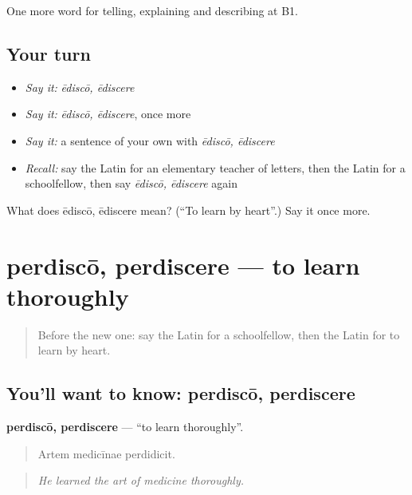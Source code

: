 \begin{grammarlens}[title={What you've built}]
One more word for telling, explaining and describing at B1.
\end{grammarlens}

\subsection*{Your turn}
\begin{itemize}
\raggedright
  \item \emph{Say it:} \emph{ēdiscō, ēdiscere}
  \item \emph{Say it:} \emph{ēdiscō, ēdiscere}, once more
  \item \emph{Say it:} a sentence of your own with \emph{ēdiscō, ēdiscere}
  \item \emph{Recall:} say the Latin for an elementary teacher of letters, then the Latin for a schoolfellow, then say \emph{ēdiscō, ēdiscere} again
\end{itemize}

\begin{tcolorbox}[breakable,colback=teal!4,colframe=teal!35!black,title={Before you move on}]
What does ēdiscō, ēdiscere mean? (\textquotedblleft{}To learn by heart\textquotedblright{}.) Say it once more.
\end{tcolorbox}
\section[perdiscō, perdiscere]{perdiscō, perdiscere — to learn thoroughly}

\label{lesson:LA-C402-perdisco}



\begin{quote}
Before the new one: say the Latin for a schoolfellow, then the Latin for to learn by heart.
\end{quote}

\subsection*{You'll want to know: perdiscō, perdiscere}
\textbf{perdiscō, perdiscere} — \textquotedblleft{}to learn thoroughly\textquotedblright{}.

\begin{quote}
Artem medicīnae perdidicit.
\end{quote}

\begin{quote}
\emph{He learned the art of medicine thoroughly.}
\end{quote}


